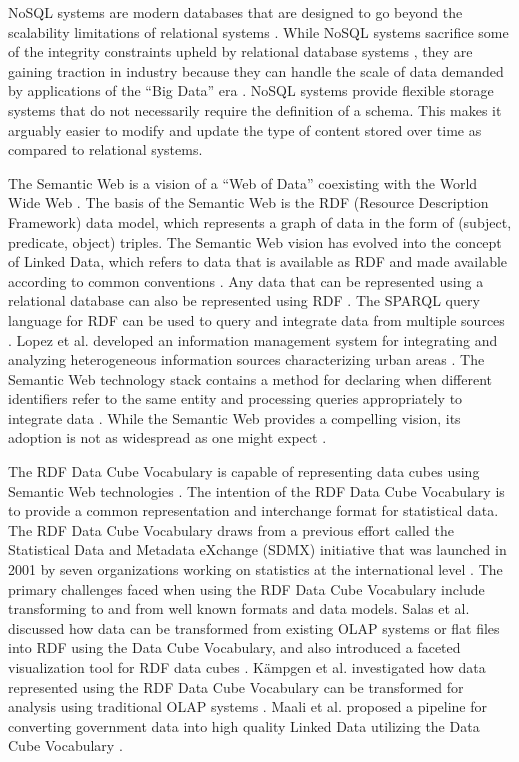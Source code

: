 \documentclass[12pt]{article}
\begin{document}
\begin{doublespace}
NoSQL systems are modern databases that are designed to go beyond the scalability limitations of relational systems \cite{cattell2011scalable}. While NoSQL systems sacrifice some of the integrity constraints upheld by relational database systems \cite{stonebraker2010sql}, they are gaining traction in industry because they can handle the scale of data demanded by applications of the ``Big Data'' era \cite{leavitt2010will}. NoSQL systems provide flexible storage systems that do not necessarily require the definition of a schema. This makes it arguably easier to modify and update the type of content stored over time as compared to relational systems.

The Semantic Web is a vision of a ``Web of Data'' coexisting with the World Wide Web \cite{berners2001semantic}. The basis of the Semantic Web is the RDF (Resource Description Framework) data model, which represents a graph of data in the form of (subject, predicate, object) triples. The Semantic Web vision has evolved into the concept of Linked Data, which refers to data that is available as RDF and made available according to common conventions \cite{bizer2009linked} \cite{bizer2007publish}. Any data that can be represented using a relational database can also be represented using RDF \cite{bizer2006d2r}. The SPARQL query language for RDF can be used to query and integrate data from multiple sources \cite{quilitz2008querying}. Lopez et al. developed an information management system for integrating and analyzing heterogeneous information sources characterizing urban areas \cite{lopez2012queriocity}. The Semantic Web technology stack contains a method for declaring when different identifiers refer to the same entity and processing queries appropriately to integrate data \cite{halpin2010owl} \cite{ding2010sameas}. While the Semantic Web provides a compelling vision, its adoption is not as widespread as one might expect \cite{lytras2008semantic}.

The RDF Data Cube Vocabulary is capable of representing data cubes using Semantic Web technologies \cite{rdfdatacube}. The intention of the RDF Data Cube Vocabulary is to provide a common representation and interchange format for statistical data. The RDF Data Cube Vocabulary draws from a previous effort called the Statistical Data and Metadata eXchange (SDMX) initiative that was launched in 2001 by seven organizations working on statistics at the international level \cite{cyganiak2010semantic}. The primary challenges faced when using the RDF Data Cube Vocabulary include transforming to and from well known formats and data models. Salas et al. discussed how data can be transformed from existing OLAP systems or flat files into RDF using the Data Cube Vocabulary, and also introduced a faceted visualization tool for RDF data cubes \cite{salas-icsc-2012}. K{\"a}mpgen et al. investigated how data represented using the RDF Data Cube Vocabulary can be transformed for analysis using traditional OLAP systems \cite{kampgen2011transforming}. Maali et al. proposed a pipeline for converting government data into high quality Linked Data utilizing the Data Cube Vocabulary \cite{maali2012publishing}.


\end{doublespace}
\end{document}
